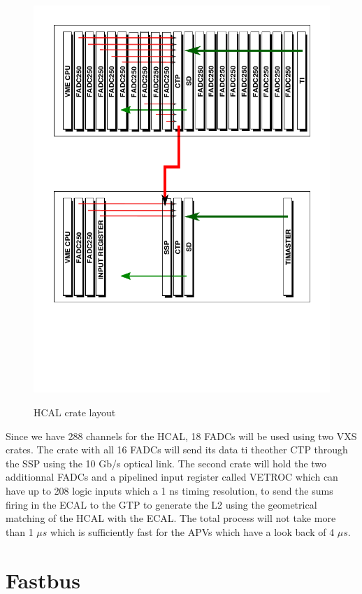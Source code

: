 \documentclass{article}
\begin{document}
\begin{figure}
  \centering
  \includegraphics[width=\textwidth]{figs/VXSHCalFADC.pdf}\\
  \caption{HCAL crate layout }\label{fig:HCALFADC}
\end{figure}

Since we have 288 channels for the HCAL, 18 FADCs will be used using two VXS crates. The crate with all 16 FADCs will send its data ti theother CTP through the SSP using the 10 Gb/s optical link. The second crate will hold the two additionnal FADCs and a pipelined input register called VETROC which can have up to 208 logic inputs which a 1 ns timing resolution, to send the sums firing in the ECAL to the GTP to generate the L2 using the geometrical matching of the HCAL with the ECAL. The total process will not take more than 1 $\mu s$ which is sufficiently fast for the APVs which have a look back of 4 $\mu s$.

\section{Fastbus}
\end{document}
